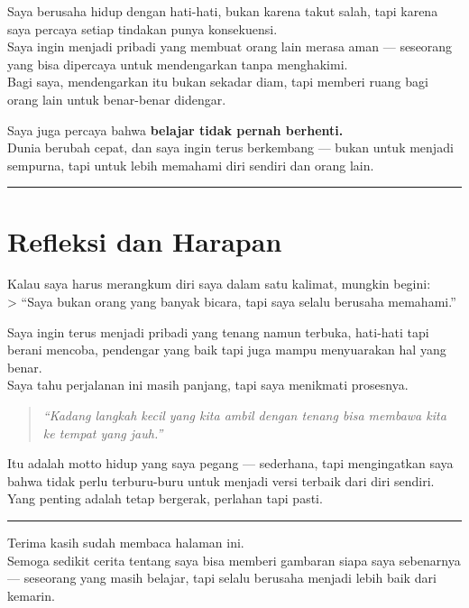 \documentclass[
  letterpaper,
  DIV=11,
  numbers=noendperiod]{scrreprt}
\begin{document}
Saya berusaha hidup dengan hati-hati, bukan karena takut salah, tapi
karena saya percaya setiap tindakan punya konsekuensi.\\
Saya ingin menjadi pribadi yang membuat orang lain merasa aman ---
seseorang yang bisa dipercaya untuk mendengarkan tanpa menghakimi.\\
Bagi saya, mendengarkan itu bukan sekadar diam, tapi memberi ruang bagi
orang lain untuk benar-benar didengar.

Saya juga percaya bahwa \textbf{belajar tidak pernah berhenti.}\\
Dunia berubah cepat, dan saya ingin terus berkembang --- bukan untuk
menjadi sempurna, tapi untuk lebih memahami diri sendiri dan orang lain.

\begin{center}\rule{0.5\linewidth}{0.5pt}\end{center}

\section{\texorpdfstring{\textbf{Refleksi dan
Harapan}}{Refleksi dan Harapan}}\label{refleksi-dan-harapan}

Kalau saya harus merangkum diri saya dalam satu kalimat, mungkin
begini:\\
\textgreater{} ``Saya bukan orang yang banyak bicara, tapi saya selalu
berusaha memahami.''

Saya ingin terus menjadi pribadi yang tenang namun terbuka, hati-hati
tapi berani mencoba, pendengar yang baik tapi juga mampu menyuarakan hal
yang benar.\\
Saya tahu perjalanan ini masih panjang, tapi saya menikmati prosesnya.

\begin{quote}
\emph{``Kadang langkah kecil yang kita ambil dengan tenang bisa membawa
kita ke tempat yang jauh.''}
\end{quote}

Itu adalah motto hidup yang saya pegang --- sederhana, tapi mengingatkan
saya bahwa tidak perlu terburu-buru untuk menjadi versi terbaik dari
diri sendiri.\\
Yang penting adalah tetap bergerak, perlahan tapi pasti.

\begin{center}\rule{0.5\linewidth}{0.5pt}\end{center}

Terima kasih sudah membaca halaman ini.\\
Semoga sedikit cerita tentang saya bisa memberi gambaran siapa saya
sebenarnya --- seseorang yang masih belajar, tapi selalu berusaha
menjadi lebih baik dari kemarin.
\end{document}
